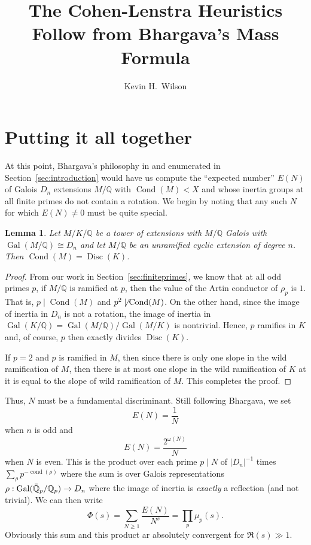 \documentclass[11pt]{article}
\title{The Cohen-Lenstra Heuristics Follow from Bhargava's Mass Formula}
\author{Kevin H.~Wilson}
\newcommand{\Gal}{\operatorname{Gal}}
\newcommand{\Disc}{\operatorname{Disc}}
\newcommand{\Qbar}{\Bar{\mathbb{Q}}}
\newcommand{\Cond}{\operatorname{Cond}}
\newcommand{\cond}{\operatorname{cond}}
\newcommand{\Q}{\mathbb{Q}}
\newtheorem{lem}{Lemma}[section]
\theoremstyle{definition}
\begin{document}
\maketitle







\section{Putting it all together}

At this point, Bhargava's philosophy in \cite{bhargavamass} and enumerated in
Section~\ref{sec:introduction} would have us compute the ``expected number''
$E(N)$ of Galois $D_n$ extensions $M/\Q$ with $\Cond(M) < X$ and whose inertia
groups at all finite primes do not contain a rotation. We begin by noting that
any such $N$ for which $E(N) \ne 0$ must be quite special.

\begin{lem}
  Let $M/K/\Q$ be a tower of extensions with $M/\Q$ Galois with $\Gal(M/\Q) \cong D_n$ and let $M/\Q$ be an unramified cyclic extension of degree $n$. Then $\Cond(M) = \Disc(K)$.
\end{lem}
\begin{proof}
  From our work in Section~\ref{sec:finiteprimes}, we know that at all odd
primes $p$, if $M/\Q$ is ramified at $p$, then the value of the Artin conductor
of $\rho_p$ is $1$. That is, $p \mid \Cond(M)$ and $p^2 \not\mid \Cond(M)$.  On
the other hand, since the image of inertia in $D_n$ is not a rotation, the
image of inertia in $\Gal(K/\Q) = \Gal(M/\Q)/\Gal(M/K)$ is nontrivial. Hence,
$p$ ramifies in $K$ and, of course, $p$ then exactly divides $\Disc(K)$.

If $p = 2$ and $p$ is ramified in $M$, then since there is only one slope in
the wild ramification of $M$, then there is at most one slope in the wild
ramification of $K$ at it is equal to the slope of wild ramification of $M$.
This completes the proof.
\end{proof}

Thus, $N$ must be a fundamental discriminant. Still following Bhargava, we set
\[ E(N) = \frac{1}{N} \]
when $n$ is odd and
\[ E(N) = \frac{2^{\omega(N)}}{N} \]
when $N$ is even. This is the product over each prime $p \mid N$ of $|D_n|^{-1}$ times $\sum_\rho p^{-\cond(\rho)}$ where the sum is over Galois representations $\rho : \Gal(\Qbar_p/\Q_p) \to D_n$ where the image of inertia is {\em exactly} a reflection (and not trivial). We can then write
\begin{equation}\label{eqn:phidefn}
\Phi(s) = \sum_{N \geq 1} \frac{E(N)}{N^s} = \prod_p \mu_p(s).
\end{equation}
Obviously this sum and this product ar absolutely convergent for $\Re(s) \gg 1$.
\end{document}
